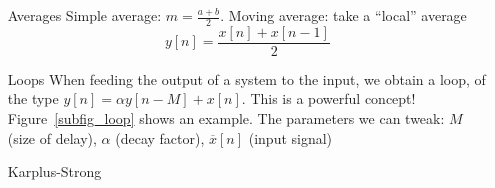 \documentclass[11pt,a4paper]{article}
\begin{document}
\begin{itemize}
    \item[Averages] Simple average: $m = \frac{a+b}{2}$. Moving average: take a ``local'' average 
        \begin{equation}
            y[n] = \frac{x[n] + x[n-1]}{2}
        \end{equation}
    \item[Loops]When feeding the output of a system to the input, we obtain a loop, of the type $y[n] = \alpha y[n-M] + x[n]$. This is a powerful concept! Figure~\ref{subfig_loop} shows an example. The parameters we can tweak: $M$ (size of delay), $\alpha$ (decay factor), $\overline{x}[n]$ (input signal)     
    \item[Karplus-Strong]\todo{}
\end{itemize}

\end{document}

